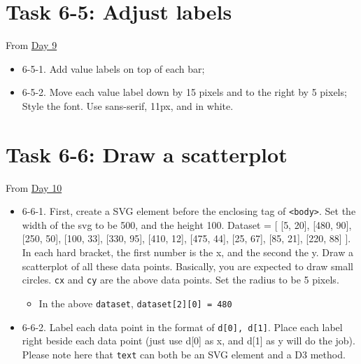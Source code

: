 \documentclass[
]{book}
\providecommand{\tightlist}{%
  \setlength{\itemsep}{0pt}\setlength{\parskip}{0pt}}
\begin{document}
\hypertarget{task-6-5-adjust-labels}{%
\section{Task 6-5: Adjust labels}\label{task-6-5-adjust-labels}}

From \href{https://observablehq.com/@hongtaoh/day-nine-spet-2-2020}{Day 9}

\begin{itemize}
\item
  6-5-1. Add value labels on top of each bar;
\item
  6-5-2. Move each value label down by 15 pixels and to the right by 5 pixels; Style the font. Use sans-serif, 11px, and in white.
\end{itemize}

\hypertarget{task-6-6-draw-a-scatterplot}{%
\section{Task 6-6: Draw a scatterplot}\label{task-6-6-draw-a-scatterplot}}

From \href{https://observablehq.com/@hongtaoh/day-ten-sept-3rd-2020}{Day 10}

\begin{itemize}
\item
  6-6-1. First, create a SVG element before the enclosing tag of \texttt{\textless{}body\textgreater{}}. Set the width of the svg to be 500, and the height 100. Dataset = {[} {[}5, 20{]}, {[}480, 90{]}, {[}250, 50{]}, {[}100, 33{]}, {[}330, 95{]}, {[}410, 12{]}, {[}475, 44{]}, {[}25, 67{]}, {[}85, 21{]}, {[}220, 88{]} {]}. In each hard bracket, the first number is the x, and the second the y. Draw a scatterplot of all these data points. Basically, you are expected to draw small circles. \texttt{cx} and \texttt{cy} are the above data points. Set the radius to be 5 pixels.

  \begin{itemize}
  \tightlist
  \item
    In the above \texttt{dataset}, \texttt{dataset{[}2{]}{[}0{]}\ =\ 480}
  \end{itemize}
\item
  6-6-2. Label each data point in the format of \texttt{d{[}0{]},\ d{[}1{]}}. Place each label right beside each data point (just use d{[}0{]} as x, and d{[}1{]} as y will do the job). Please note here that \texttt{text} can both be an SVG element and a D3 method.
\end{itemize}
\end{document}
